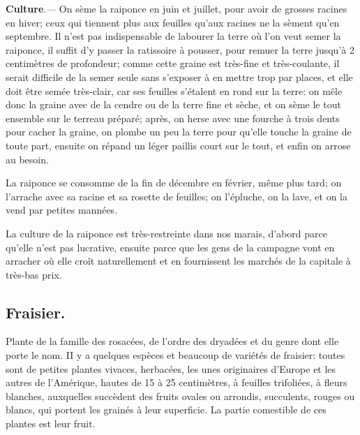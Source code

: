 \documentclass[10pt,a4paper]{book}
\begin{document}
\textbf{Culture}.--- On sème la raiponce en juin et juillet, pour avoir de grosses racines en hiver; ceux qui tiennent plus aux feuilles qu'aux racines ne la sèment qu'en septembre. Il n'est pas indispensable de labourer la terre où l'on veut semer la raiponce, il suffit d'y passer la ratissoire à pousser, pour remuer la terre jusqu'à 2 centimètres de profondeur; comme cette graine est très-fine et très-coulante, il serait difficile de la semer seule sans s'exposer à en mettre trop par places, et elle doit être semée très-clair, car ses feuilles s'étalent en rond sur la terre: on mêle donc la graine avec de la cendre ou de la terre fine et sèche, et on sème le tout ensemble sur le terreau préparé; après, on herse avec une fourche à trois dents pour cacher la graine, on plombe un peu la terre pour qu'elle touche la graine de toute part, ensuite on répand un léger paillis court sur le tout, et enfin on arrose au besoin.

La raiponce se consomme de la fin de décembre en février, même plus tard; on l'arrache avec sa racine et sa rosette de feuilles; on l'épluche, on la lave, et on la vend par petites mannées.

La culture de la raiponce est très-restreinte dans nos marais, d'abord parce qu'elle n'est pas lucrative, ensuite parce que les gens de la campagne vont en arracher où elle croît naturellement et en fournissent les marchés de la capitale à très-bas prix.

\subsection{Fraisier.}

Plante de la famille des rosacées, de l'ordre des dryadées et du genre dont elle porte le nom. II y a quelques espèces et beaucoup de variétés de fraisier: toutes sont de petites plantes vivaces, herbacées, les unes originaires d'Europe et les autres de l'Amérique, hautes de 15 à 25 centimètres, à feuilles trifoliées, à fleurs blanches, auxquelles succèdent des fruits ovales ou arrondis, succulents, rouges ou blancs, qui portent les grainés à leur superficie. La partie comestible de ces plantes est leur fruit.
\end{document}
